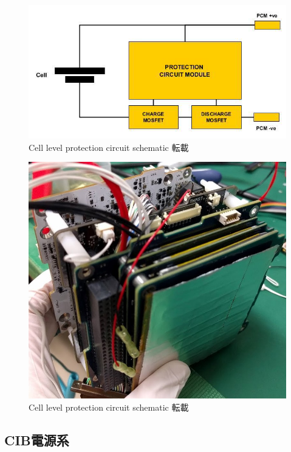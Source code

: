 \begin{figure}[htbp]
	\begin{center}
		\includegraphics[width=0.5\linewidth]{./03/fig/cell_protection.png}
		\caption{Cell level protection circuit schematic 転載}
		\label{cell_p}
	\end{center}
\end{figure}

\begin{figure}[htbp]
	\begin{center}
		\includegraphics[width=0.5\linewidth]{./03/fig/heater.jpg}
		\caption{Cell level protection circuit schematic 転載}
		\label{cell_p}
	\end{center}
\end{figure}

\subsection{CIB電源系}

